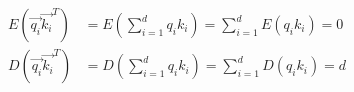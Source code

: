 \begin{align*}
E(\vec{q_i}\vec{k_i}^T) &= E(\sum_{i=1}^d q_ik_i) = \sum_{i=1}^d E(q_ik_i) = 0 \\
D(\vec{q_i}\vec{k_i}^T) &= D(\sum_{i=1}^d q_ik_i) = \sum_{i=1}^d D(q_ik_i) = d
\end{align*}